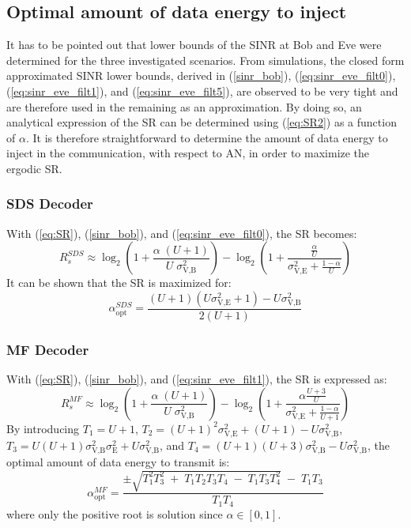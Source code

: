 \documentclass[12pt, draftclsnofoot, onecolumn]{IEEEtran}
\begin{document}
\subsection{Optimal amount of data energy to inject}
\label{subsec:best_alpha}
It has to be pointed out that lower bounds of the SINR at Bob and Eve were determined for the three investigated scenarios. From simulations, the closed form approximated SINR lower bounds, derived in (\ref{sinr_bob}),  (\ref{eq:sinr_eve_filt0}), (\ref{eq:sinr_eve_filt1}), and (\ref{eq:sinr_eve_filt5}), are observed to be very tight and are therefore used in the remaining as an approximation. By doing so, an analytical expression of the SR can be determined using (\ref{eq:SR2}) as a function of $\alpha$. It is therefore straightforward to determine the amount of data energy to inject in the communication, with respect to AN, in order to maximize the ergodic SR.
\subsubsection{SDS Decoder}
 With (\ref{eq:SR}), (\ref{sinr_bob}), and (\ref{eq:sinr_eve_filt0}), the SR becomes:
\begin{equation}
R_s^{SDS} \approx \log_2 \left( 1 +  \frac{\alpha \;(U+1)}{U \; \sigma_{\text{V,B}}^2} \right) - \log_2\left( 1 + \frac{\frac{\alpha}{U}}{\sigma^2_{\text{V,E}}+\frac{1-\alpha}{U}}\right)
\label{eq:SR_anal2_decod_0}
\end{equation}
It can be shown that the SR is maximized for:
\begin{equation}
\alpha_{\text{opt}}^{SDS} = \frac{(U+1)(U\sigma_{\text{V,E}}^2 + 1)- U\sigma_{\text{V,B}}^2}{2(U+1)}
\label{eq:optimal_alpha_decod_0}
\end{equation}


\subsubsection{MF Decoder}
With (\ref{eq:SR}), (\ref{sinr_bob}), and (\ref{eq:sinr_eve_filt1}), the SR is expressed as:
\begin{equation}
R_s^{MF} \approx \log_2 \left( 1 +  \frac{\alpha \;(U+1)}{U \; \sigma_{\text{V,B}}^2} \right) - \log_2\left( 1 +  \frac{\alpha \frac{U+3}{U}}{\sigma^2_{\text{V,E}} + \frac{1-\alpha}{U+1}}\right)
\label{eq:SR_anal2_decod_1}
\end{equation}
By introducing $T_1 = U+1$, $T_2 = (U+1)^2\sigma_{\text{V,E}}^2 + (U+1) - U\sigma_{\text{V,B}}^2$, $T_3 = U(U+1)\sigma_{\text{V,B}}^2\sigma_{\text{E}}^2 + U \sigma_{\text{V,B}}^2$, and $T_4=(U+1)(U+3)\sigma_{\text{V,B}}^2-U\sigma_{\text{V,B}}^2$, the optimal amount of data energy to transmit is: 
\begin{equation}
\alpha_{\text{opt}}^{MF} = \frac{\pm\sqrt{T_1^2 T_3^2 \; + \; T_1 T_2 T_3 T_4 \; - \; T_1 T_3 T_4^2} \; - \; T_1 T_3}{T_1 T_4}
\label{eq:optimal_alpha_decod_1}
\end{equation}
where only the positive root is solution since $\alpha \in [0,1]$.
\end{document}

